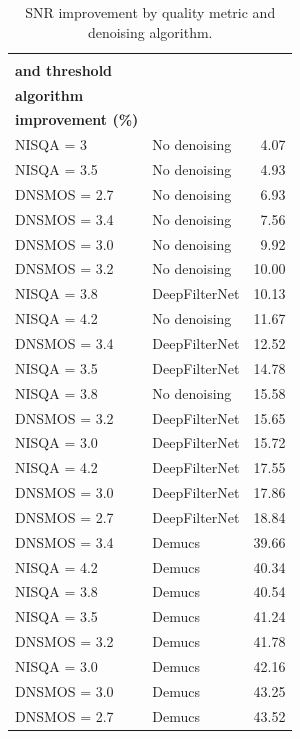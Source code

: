 \begin{table}[ht]
\centering
\small
\caption{SNR improvement by quality metric and denoising algorithm.}
\label{tab:snr-improvement}
\begin{tabular}{@{} l l r @{}}
\toprule
\shortstack{\textbf{Quality filter}\\\textbf{and threshold}} &
\shortstack{\textbf{Denoising}\\\textbf{algorithm}} &
\shortstack{\textbf{SNR}\\\textbf{improvement (\%)}} \\
\midrule
NISQA = 3    & No denoising     & 4.07 \\
NISQA = 3.5  & No denoising     & 4.93 \\
DNSMOS = 2.7 & No denoising     & 6.93 \\
DNSMOS = 3.4 & No denoising     & 7.56 \\
DNSMOS = 3.0 & No denoising     & 9.92 \\
DNSMOS = 3.2 & No denoising     & 10.00 \\
NISQA = 3.8  & DeepFilterNet    & 10.13 \\
NISQA = 4.2  & No denoising     & 11.67 \\
DNSMOS = 3.4 & DeepFilterNet    & 12.52 \\
NISQA = 3.5  & DeepFilterNet    & 14.78 \\
NISQA = 3.8  & No denoising     & 15.58 \\
DNSMOS = 3.2 & DeepFilterNet    & 15.65 \\
NISQA = 3.0  & DeepFilterNet    & 15.72 \\
NISQA = 4.2  & DeepFilterNet    & 17.55 \\
DNSMOS = 3.0 & DeepFilterNet    & 17.86 \\
DNSMOS = 2.7 & DeepFilterNet    & 18.84 \\
DNSMOS = 3.4 & Demucs           & 39.66 \\
NISQA = 4.2  & Demucs           & 40.34 \\
NISQA = 3.8  & Demucs           & 40.54 \\
NISQA = 3.5  & Demucs           & 41.24 \\
DNSMOS = 3.2 & Demucs           & 41.78 \\
NISQA = 3.0  & Demucs           & 42.16 \\
DNSMOS = 3.0 & Demucs           & 43.25 \\
DNSMOS = 2.7 & Demucs           & 43.52 \\
\bottomrule
\end{tabular}
\end{table}

